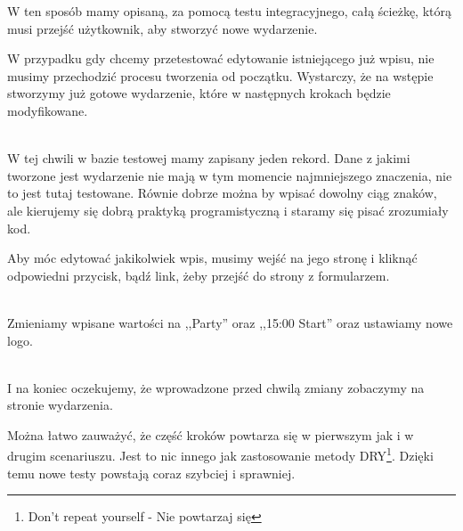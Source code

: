 W ten sposób mamy opisaną, za pomocą testu integracyjnego, całą ścieżkę, którą musi przejść użytkownik, aby stworzyć nowe wydarzenie.

W przypadku gdy chcemy przetestować edytowanie istniejącego już wpisu, nie musimy przechodzić procesu tworzenia od początku. Wystarczy, że na wstępie stworzymy już gotowe wydarzenie, które w następnych krokach będzie modyfikowane.

\begin{code}
	
\end{code}\\

W tej chwili w bazie testowej mamy zapisany jeden rekord. Dane z jakimi tworzone jest wydarzenie nie mają w tym momencie najmniejszego znaczenia, nie to jest tutaj testowane. Równie dobrze można by wpisać dowolny ciąg znaków, ale kierujemy się dobrą praktyką programistyczną i staramy się pisać zrozumiały kod.

Aby móc edytować jakikolwiek wpis, musimy wejść na jego stronę i kliknąć odpowiedni przycisk, bądź link, żeby przejść do strony z formularzem.

\begin{code}
	
\end{code}\\

Zmieniamy wpisane wartości na ,,Party'' oraz ,,15:00 Start'' oraz ustawiamy nowe logo.

\begin{code}
	
\end{code}\\

I na koniec oczekujemy, że wprowadzone przed chwilą zmiany zobaczymy na stronie wydarzenia.

\begin{code}
	
\end{code}

Można łatwo zauważyć, że część kroków powtarza się w pierwszym jak i w drugim scenariuszu. Jest to nic innego jak zastosowanie metody DRY\footnote{Don't repeat yourself - Nie powtarzaj się}. Dzięki temu nowe testy powstają coraz szybciej i sprawniej.

